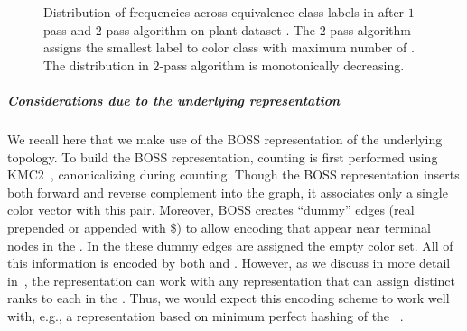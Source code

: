 \begin{figure}[h]
\centering
{}
    \caption{
    Distribution of \kmer frequencies across equivalence class labels in \rainbowfish
    after $1$-pass and $2$-pass algorithm on plant dataset
    . The $2$-pass algorithm assigns the smallest label
    to color class with maximum number of \kmers. The distribution in $2$-pass
    algorithm is monotonically decreasing. 
  }
      \label{fig:plant-eq-class-dist}
\end{figure}

\subparagraph{Considerations due to the underlying \dbg representation} We recall here that we make use of the BOSS representation of the underlying \dbg topology. To build the BOSS representation, \kmer counting is first performed using KMC2~\cite{Deorowicz15KMC}, canonicalizing \kmers during counting. Though the BOSS representation inserts both forward and reverse complement \kmers into the graph, it associates only a single color vector with this pair.  Moreover, BOSS creates ``dummy'' edges (real \kmers prepended or appended with \$) to allow encoding \kmers that appear near terminal nodes in the \dbg. In the \cdbg these dummy edges are assigned the empty color set. All of this information is encoded by both \vari and \rainbowfish. However, as we discuss in more detail in~, the \rainbowfish representation can work with any \dbg representation that can assign distinct ranks to each \kmer in the \dbg. Thus, we would expect this encoding scheme to work well with, e.g., a \dbg representation based on minimum perfect hashing of the
\kmers~\cite{drezen2014gatb}.

